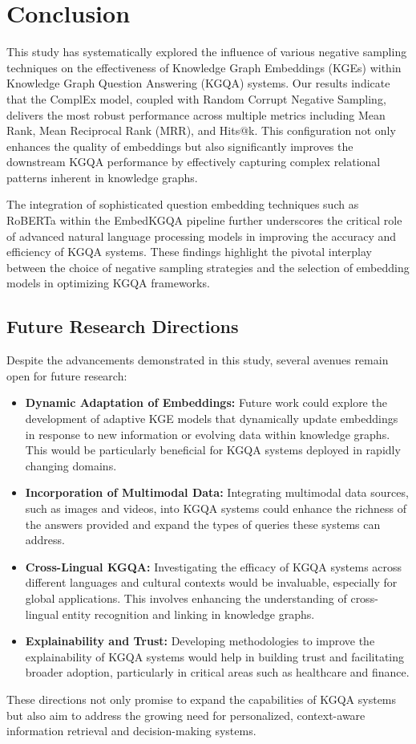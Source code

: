 \documentclass[12pt]{article}
\begin{document}
\section{Conclusion}

This study has systematically explored the influence of various negative sampling techniques on the effectiveness of Knowledge Graph Embeddings (KGEs) within Knowledge Graph Question Answering (KGQA) systems. Our results indicate that the ComplEx model, coupled with Random Corrupt Negative Sampling, delivers the most robust performance across multiple metrics including Mean Rank, Mean Reciprocal Rank (MRR), and Hits@k. This configuration not only enhances the quality of embeddings but also significantly improves the downstream KGQA performance by effectively capturing complex relational patterns inherent in knowledge graphs.

The integration of sophisticated question embedding techniques such as RoBERTa within the EmbedKGQA pipeline further underscores the critical role of advanced natural language processing models in improving the accuracy and efficiency of KGQA systems. These findings highlight the pivotal interplay between the choice of negative sampling strategies and the selection of embedding models in optimizing KGQA frameworks.

\subsection{Future Research Directions}

Despite the advancements demonstrated in this study, several avenues remain open for future research:
\begin{itemize}
  \item \textbf{Dynamic Adaptation of Embeddings:} Future work could explore the development of adaptive KGE models that dynamically update embeddings in response to new information or evolving data within knowledge graphs. This would be particularly beneficial for KGQA systems deployed in rapidly changing domains.
  \item \textbf{Incorporation of Multimodal Data:} Integrating multimodal data sources, such as images and videos, into KGQA systems could enhance the richness of the answers provided and expand the types of queries these systems can address.
  \item \textbf{Cross-Lingual KGQA:} Investigating the efficacy of KGQA systems across different languages and cultural contexts would be invaluable, especially for global applications. This involves enhancing the understanding of cross-lingual entity recognition and linking in knowledge graphs.
  \item \textbf{Explainability and Trust:} Developing methodologies to improve the explainability of KGQA systems would help in building trust and facilitating broader adoption, particularly in critical areas such as healthcare and finance.
\end{itemize}

These directions not only promise to expand the capabilities of KGQA systems but also aim to address the growing need for personalized, context-aware information retrieval and decision-making systems.

\printbibliography
\end{document}

